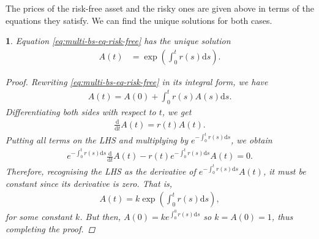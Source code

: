 \documentclass[english]{article}
\numberwithin{equation}{section}
\numberwithin{figure}{section}
\theoremstyle{bolddescit}
\newtheorem{theorem}{\protect\theoremname}[section]
\theoremstyle{definition}
\theoremstyle{definition}
\theoremstyle{plain}
\theoremstyle{plain}
\theoremstyle{bolddesc}
\theoremstyle{plain}
\theoremstyle{remark}
\providecommand{\theoremname}{Theorem}
\begin{document}
The prices of the risk-free asset and the risky ones are given above in terms of the equations they satisfy. We can find the unique solutions for both cases.

\begin{theorem}\label{thm:bs-solution-risk-free}
  Equation \eqref{eq:multi-bs-eq-risk-free} has the unique solution
  \begin{align*}
    A(t) &= \exp \left( \int_0^t r(s) \mathrm{d}s \right).
  \end{align*}

  \begin{proof}
    Rewriting \eqref{eq:multi-bs-eq-risk-free} in its integral form, we have
    \begin{align*}
      A(t) = A(0) + \int_0^t r(s) A(s) \mathrm{d}s.
    \end{align*}
    Differentiating both sides with respect to $t$, we get
    \begin{align*}
      \frac{\mathrm{d}}{\mathrm{d}t}A(t) = r(t) A(t).
    \end{align*}
    Putting all terms on the LHS and multiplying by $e^{-\int_0^t r(s) \mathrm{d}s}$, we obtain
    \begin{align*}
      e^{-\int_0^t r(s) \mathrm{d}s} \frac{\mathrm{d}}{\mathrm{d}t}A(t) - r(t) e^{-\int_0^t r(s) \mathrm{d}s} A(t) = 0.
    \end{align*}
    Therefore, recognising the LHS as the derivative of $e^{-\int_0^t r(s) \mathrm{d}s} A(t)$, it must be constant since its derivative is zero. That is,
    \begin{align*}
      A(t) = k \exp\left(\int_0^t r(s) \mathrm{d}s\right),
    \end{align*}
    for some constant $k$. But then, $A(0) = k e^{\int_0^0 r(s) \mathrm{d}s}$ so $k = A(0) = 1$, thus completing the proof.
  \end{proof}
\end{theorem}
\end{document}
